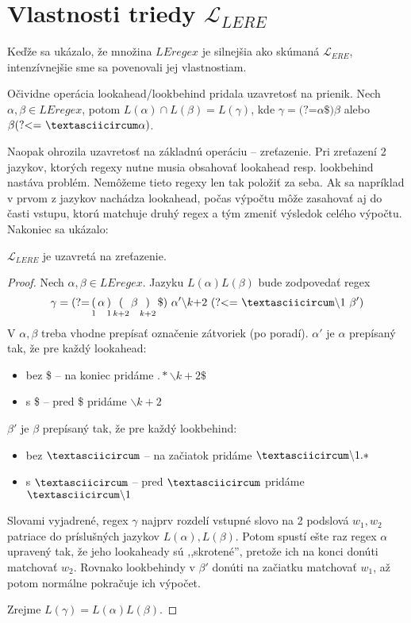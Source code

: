 \documentclass{svk_long_sk}
\def\le{LEregex}
\def\el{\mathscr{L}_{ERE}}
\def\lel{\mathscr{L}_{LERE}}
\def\lookahead{\text{(?=}}
\def\lookbehind{\text{(?\textless =}}
\begin{document}
\section{Vlastnosti triedy $\lel$}

Keďže sa ukázalo, že množina $\le$ je silnejšia ako skúmaná $\el$, intenzívnejšie sme sa povenovali jej vlastnostiam.

Očividne operácia lookahead/lookbehind pridala uzavretosť na prienik. Nech $\alpha,\beta\in\le$, potom $L(\alpha)\cap L(\beta) = L(\gamma)$, kde $\gamma = \lookahead \alpha \$)\beta$ alebo $\beta \lookbehind ~\textasciicircum \alpha)$.

Naopak ohrozila uzavretosť na základnú operáciu -- zreťazenie. Pri zreťazení 2 jazykov, ktorých regexy nutne musia obsahovať lookahead resp. lookbehind nastáva problém. Nemôžeme tieto regexy len tak položiť za seba. Ak sa napríklad v prvom z jazykov nachádza lookahead, počas výpočtu môže zasahovať aj do časti vstupu, ktorú matchuje druhý regex a tým zmeniť výsledok celého výpočtu. Nakoniec sa ukázalo:
\begin{theorem}
$\lel$ je uzavretá na zreťazenie.
\end{theorem}
\begin{proof}
Nech $\alpha,\beta\in\le$. Jazyku $L(\alpha)L(\beta)$ bude zodpovedať regex
$$
\gamma = \lookahead \mathop(_1 \alpha \mathop)_1 \mathop(_{k+2}\beta \mathop)_{k+2} \mathdollar) ~\alpha ' \backslash k\text{+2}~ \lookbehind ~\textasciicircum\backslash 1~\beta ')
$$
V $\alpha,\beta$ treba vhodne prepísať označenie zátvoriek (po poradí). $\alpha '$ je $\alpha$ prepísaný tak, že pre každý look\-ahead:
\begin{itemize}
\item bez \$ -- na koniec pridáme $.* \backslash k+2 \mathdollar $
\item s \$ -- pred \$ pridáme $\backslash k+2$
\end{itemize}
$\beta '$ je $\beta$ prepísaný tak, že pre každý lookbehind:
\begin{itemize}
\item bez $\textasciicircum$ -- na začiatok pridáme $\textasciicircum \backslash 1.*$
\item s $\textasciicircum$ -- pred $\textasciicircum$ pridáme $\textasciicircum \backslash 1$
\end{itemize}

Slovami vyjadrené, regex $\gamma$ najprv rozdelí vstupné slovo na 2 podslová $w_1,w_2$ patriace do príslušných jazykov $L(\alpha), L(\beta)$. Potom spustí ešte raz regex $\alpha$ upravený tak, že jeho lookaheady sú ,,skrotené'', pretože ich na konci donúti matchovať $w_2$. Rovnako look\-behindy v $\beta'$ donúti na začiatku matchovať $w_1$, až potom normálne pokračuje ich výpočet.

Zrejme $L(\gamma)=L(\alpha)L(\beta)$.
\end{proof}
\end{document}
